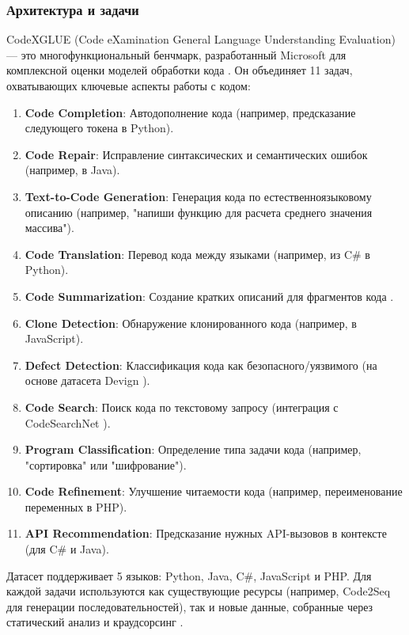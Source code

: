 \documentclass[14pt]{article}
\theoremstyle{definition}
\begin{document}
\subsubsection{Архитектура и задачи}
CodeXGLUE (Code eXamination General Language Understanding Evaluation) — это многофункциональный бенчмарк, разработанный Microsoft для комплексной оценки моделей обработки кода \cite{lu2021codexglue}. Он объединяет 11 задач, охватывающих ключевые аспекты работы с кодом:

\begin{enumerate}
    \item \textbf{Code Completion}: Автодополнение кода (например, предсказание следующего токена в Python).
    \item \textbf{Code Repair}: Исправление синтаксических и семантических ошибок (например, в Java).
    \item \textbf{Text-to-Code Generation}: Генерация кода по естественноязыковому описанию (например, "напиши функцию для расчета среднего значения массива").
    \item \textbf{Code Translation}: Перевод кода между языками (например, из C# в Python).
    \item \textbf{Code Summarization}: Создание кратких описаний для фрагментов кода \cite{ren2021codebleu}.
    \item \textbf{Clone Detection}: Обнаружение клонированного кода (например, в JavaScript).
    \item \textbf{Defect Detection}: Классификация кода как безопасного/уязвимого (на основе датасета Devign \cite{zhou2022devign}).
    \item \textbf{Code Search}: Поиск кода по текстовому запросу (интеграция с CodeSearchNet \cite{husain2019codesearchnet}).
    \item \textbf{Program Classification}: Определение типа задачи кода (например, "сортировка" или "шифрование").
    \item \textbf{Code Refinement}: Улучшение читаемости кода (например, переименование переменных в PHP).
    \item \textbf{API Recommendation}: Предсказание нужных API-вызовов в контексте (для C\# и Java).
\end{enumerate}

Датасет поддерживает 5 языков: Python, Java, C\#, JavaScript и PHP. Для каждой задачи используются как существующие ресурсы (например, Code2Seq \cite{alon2019code2seq} для генерации последовательностей), так и новые данные, собранные через статический анализ и краудсорсинг \cite{lu2021codexglue}.
\end{document}
